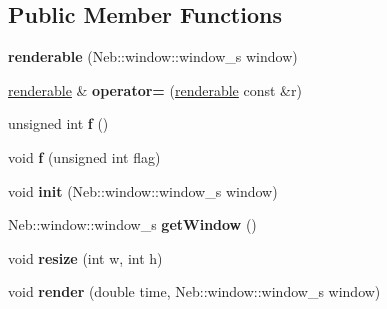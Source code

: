 \subsection*{\-Public \-Member \-Functions}
\begin{DoxyCompactItemize}
\item 
\hypertarget{classglutpp_1_1renderable_af3b47768c919df0faf660899c33dd6e8}{{\bfseries renderable} (\-Neb\-::window\-::window\-\_\-s window)}\label{classglutpp_1_1renderable_af3b47768c919df0faf660899c33dd6e8}

\item 
\hypertarget{classglutpp_1_1renderable_a7c18c1b5d009a3fb73f86e335ffcc556}{\hyperlink{classglutpp_1_1renderable}{renderable} \& {\bfseries operator=} (\hyperlink{classglutpp_1_1renderable}{renderable} const \&r)}\label{classglutpp_1_1renderable_a7c18c1b5d009a3fb73f86e335ffcc556}

\item 
\hypertarget{classglutpp_1_1renderable_aac705af4136c474069d851a9520f5720}{unsigned int {\bfseries f} ()}\label{classglutpp_1_1renderable_aac705af4136c474069d851a9520f5720}

\item 
\hypertarget{classglutpp_1_1renderable_a971cd016cc408f732f5d0460744e2a48}{void {\bfseries f} (unsigned int flag)}\label{classglutpp_1_1renderable_a971cd016cc408f732f5d0460744e2a48}

\item 
\hypertarget{classglutpp_1_1renderable_a7ff2af24b83fef9b240858976257ab3d}{void {\bfseries init} (\-Neb\-::window\-::window\-\_\-s window)}\label{classglutpp_1_1renderable_a7ff2af24b83fef9b240858976257ab3d}

\item 
\hypertarget{classglutpp_1_1renderable_a33656881f53f9be7bab71ea5cc316ef1}{\-Neb\-::window\-::window\-\_\-s {\bfseries get\-Window} ()}\label{classglutpp_1_1renderable_a33656881f53f9be7bab71ea5cc316ef1}

\item 
\hypertarget{classglutpp_1_1renderable_abd73b2bba233d1ff95fe46496888a5cf}{void {\bfseries resize} (int w, int h)}\label{classglutpp_1_1renderable_abd73b2bba233d1ff95fe46496888a5cf}

\item 
\hypertarget{classglutpp_1_1renderable_ab9c70cca0380015ecfde70d9a106c31c}{void {\bfseries render} (double time, \-Neb\-::window\-::window\-\_\-s window)}\label{classglutpp_1_1renderable_ab9c70cca0380015ecfde70d9a106c31c}

\end{DoxyCompactItemize}
